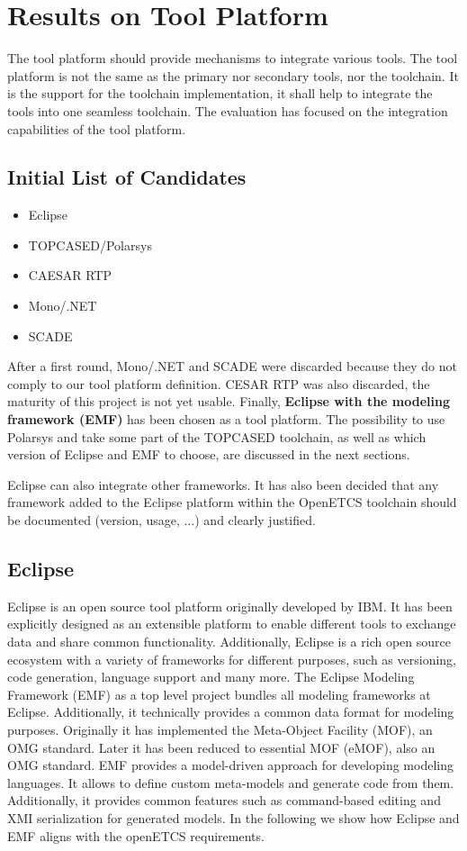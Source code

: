 \chapter{Results on Tool Platform}
\label{sec:platform}

The tool platform should provide mechanisms to integrate various
tools. The tool platform is not the same as the primary nor secondary tools, nor
the toolchain. It is the support for the toolchain implementation,
it shall help to integrate the tools into one seamless toolchain.
The evaluation has focused on the integration capabilities of the tool platform.

\section{Initial List of Candidates}
\begin{itemize}
\item Eclipse 
\item TOPCASED/Polarsys
\item CAESAR RTP
\item Mono/.NET 
\item SCADE
\end{itemize}

After a first round, Mono/.NET and SCADE were discarded because they do
not comply to our tool platform definition.  CESAR RTP was also
discarded, the maturity of this project is not yet usable. Finally,
{\bf Eclipse with the modeling framework (EMF)} has been chosen as a tool
platform. The possibility to use Polarsys and take some part of the
TOPCASED toolchain, as well as which version of Eclipse  and EMF to choose, are
discussed in the next sections.  

Eclipse can also integrate other frameworks. It has also been decided that any
framework added to the Eclipse platform within the OpenETCS toolchain
should be documented (version, usage, ...) and clearly justified.

\section{Eclipse}
Eclipse is an open source tool platform originally developed by
IBM. It has been explicitly designed as an extensible platform to
enable different tools to exchange data and share common
functionality. Additionally, Eclipse is a rich open source ecosystem
with a variety of frameworks for different purposes, such as
versioning, code generation, language support and many more. The
Eclipse Modeling Framework (EMF) as a top level project bundles all
modeling frameworks at Eclipse. Additionally, it technically provides a
common data format for modeling purposes. Originally it has
implemented the Meta-Object Facility (MOF), an OMG standard. Later it has
been reduced to essential MOF (eMOF), also an OMG standard. EMF provides a
model-driven approach for developing modeling languages. It allows to
define custom meta-models and generate code from them. Additionally, it
provides common features such as command-based editing and XMI
serialization for generated models. In the following we show how
Eclipse and EMF aligns with the openETCS requirements.

